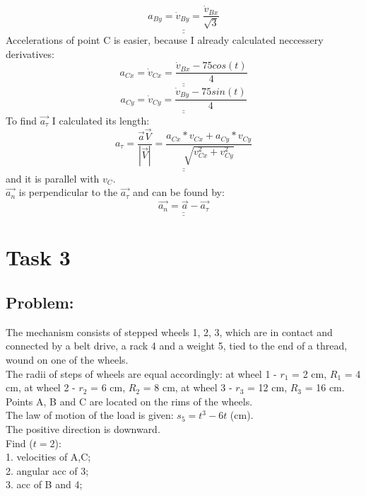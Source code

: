 \documentclass[a4paper,11pt,oneside,article]{memoir}
\def\doubleunderline#1{\underline{\underline{#1}}}
\begin{document}
\begin{equation*}
    \doubleunderline{
        a_{By} = \dot v_{By} = \frac{\dot v_{Bx}}{\sqrt{3}}
    }
\end{equation*}
Accelerations of point C is easier, because I already calculated neccessery derivatives:
\begin{equation*}
    \doubleunderline{
        a_{Cx} = \dot v_{Cx} = \frac{\dot v_{Bx} - 75 cos(t)}{4}
    }
\end{equation*}
\begin{equation*}
    \doubleunderline{
        a_{Cy} = \dot v_{Cy} = \frac{\dot v_{By} - 75 sin(t)}{4}
    }
\end{equation*}
To find $\overrightarrow{a_{\tau}}$ I calculated its length:
\begin{equation*}
\doubleunderline{
    a_{\tau} = \frac{\overrightarrow{a}{\overrightarrow{V}}}{{|\overrightarrow{V}|}} = \frac{a_{Cx}*v_{Cx} + a_{Cy}*v_{Cy}}{\sqrt{v^2_{Cx} + v^2_{Cy}}} 
    }
\end{equation*}
and it is parallel with $v_C$.\\
$\overrightarrow{a_n}$ is perpendicular to the $\overrightarrow{a_{\tau}}$ and can be found by:
\begin{equation*}
\doubleunderline{
    \overrightarrow{a_n} = \overrightarrow{a} - \overrightarrow{a_{\tau}}
    }
\end{equation*}

\section*{Task 3}

\subsection{Problem:}
The mechanism consists of stepped wheels 1, 2, 3, which are in contact and connected by a belt drive, a rack 4 and a weight 5, tied to the end of a thread, wound on one of the wheels. \\
The radii of steps of wheels are equal accordingly: at wheel 1 - $r_1$ = 2 cm, $R_1$ = 4 cm, at wheel 2 - $r_2$ = 6 cm, $R_2$ = 8 cm, at wheel 3 - $r_3$ = 12 cm, $R_3$ = 16 cm. Points A, B and C are located on the rims of the wheels.\\
The law of motion of the load is given: $s_5 = t^3-6t$ (cm).\\
The positive direction is downward.\\
Find ($t = 2$):\\
1. velocities of A,C;\\
2. angular acc of 3;\\
3. acc of B and 4;\\
\end{document}

